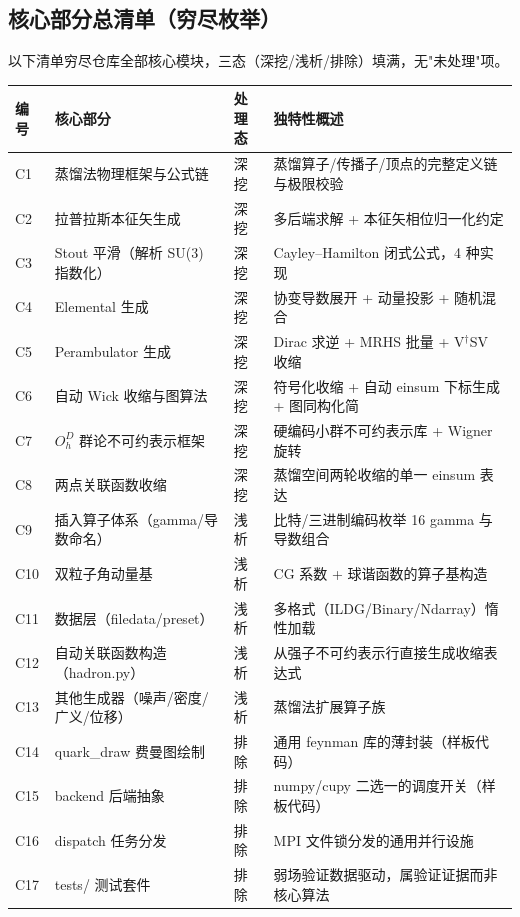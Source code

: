 \documentclass[UTF8]{ctexart}
\begin{document}
\subsection{核心部分总清单（穷尽枚举）}
以下清单穷尽仓库全部核心模块，三态（深挖/浅析/排除）填满，无"未处理"项。

\begin{xltabular}{\textwidth}{lllX}
\toprule
\textcolor{algo}{编号} & 核心部分 & 处理态 & 独特性概述 \\
\midrule
\endhead
C1 & 蒸馏法物理框架与公式链 & 深挖 & 蒸馏算子/传播子/顶点的完整定义链与极限校验 \\
C2 & 拉普拉斯本征矢生成 & 深挖 & 多后端求解 + 本征矢相位归一化约定 \\
C3 & Stout 平滑（解析 SU(3) 指数化） & 深挖 & Cayley--Hamilton 闭式公式，4 种实现 \\
C4 & Elemental 生成 & 深挖 & 协变导数展开 + 动量投影 + 随机混合 \\
C5 & Perambulator 生成 & 深挖 & Dirac 求逆 + MRHS 批量 + V$^\dagger$SV 收缩 \\
C6 & 自动 Wick 收缩与图算法 & 深挖 & 符号化收缩 + 自动 einsum 下标生成 + 图同构化简 \\
C7 & $O_h^D$ 群论不可约表示框架 & 深挖 & 硬编码小群不可约表示库 + Wigner 旋转 \\
C8 & 两点关联函数收缩 & 深挖 & 蒸馏空间两轮收缩的单一 einsum 表达 \\
C9 & 插入算子体系（gamma/导数命名） & 浅析 & 比特/三进制编码枚举 16 gamma 与导数组合 \\
C10 & 双粒子角动量基 & 浅析 & CG 系数 + 球谐函数的算子基构造 \\
C11 & 数据层（filedata/preset） & 浅析 & 多格式（ILDG/Binary/Ndarray）惰性加载 \\
C12 & 自动关联函数构造（hadron.py） & 浅析 & 从强子不可约表示行直接生成收缩表达式 \\
C13 & 其他生成器（噪声/密度/广义/位移） & 浅析 & 蒸馏法扩展算子族 \\
C14 & quark\_draw 费曼图绘制 & 排除 & 通用 feynman 库的薄封装（样板代码） \\
C15 & backend 后端抽象 & 排除 & numpy/cupy 二选一的调度开关（样板代码） \\
C16 & dispatch 任务分发 & 排除 & MPI 文件锁分发的通用并行设施 \\
C17 & tests/ 测试套件 & 排除 & 弱场验证数据驱动，属验证证据而非核心算法 \\
\bottomrule
\end{xltabular}
\end{document}
